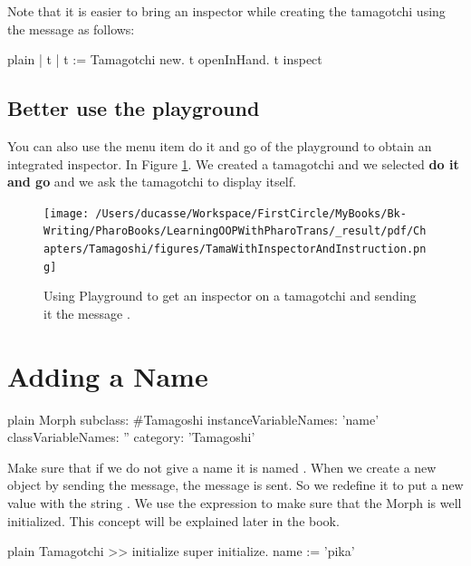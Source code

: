 \documentclass[10pt,twoside,english]{_support/latex/sbabook/sbabook}
\begin{document}
Note that it is easier to bring an inspector while creating the tamagotchi using the message  as follows:

\begin{displaycode}{plain}
| t |
t := Tamagotchi new.
t openInHand.
t inspect
\end{displaycode}
\subsection{Better use the playground}
You can also use the menu item do it and go of the playground to obtain an integrated inspector. In Figure \ref{TamaWithInspectorAndInstruction}. We created a tamagotchi and we selected \textbf{do it and go} and we ask the tamagotchi to display itself.  


\begin{figure}

\begin{center}
\texttt{[image: /Users/ducasse/Workspace/FirstCircle/MyBooks/Bk-Writing/PharoBooks/LearningOOPWithPharoTrans/\_result/pdf/Chapters/Tamagoshi/figures/TamaWithInspectorAndInstruction.png]}\caption{Using Playground to get an inspector on a tamagotchi and sending it the message . \label{TamaWithInspectorAndInstruction}}\end{center}
\end{figure}

\section{Adding a Name}
\begin{displaycode}{plain}
Morph subclass: #Tamagoshi
	instanceVariableNames: 'name'
	classVariableNames: ''
	category: 'Tamagoshi'
\end{displaycode}

Make sure that if we do not give a name it is named .  When we create a new object by sending  the  message, the message  is sent. 
So we redefine it to put a new value with the string . We use the expression  to make sure that the Morph is well initialized. This concept will be explained later in the book. 

\begin{displaycode}{plain}
Tamagotchi >> initialize
	super initialize. 
	name := 'pika'
\end{displaycode}
\end{document}

